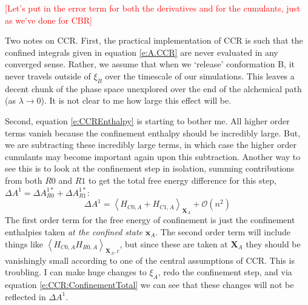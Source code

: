 \documentclass[%
 preprint,
 amsmath,amssymb,
 aps,
]{revtex4-1}
\newcommand{\warning}[1]{{\textsf{{\textcolor{red}{{[#1]}{}}}}}}
\renewcommand{\vec}[1]{{\mathbf{#1}}}
\begin{document}
 \warning{Let's put in the error term for both the derivatives and for the cumulants, just as we've done for CBR}
 
Two notes on CCR.  First, the practical implementation of CCR is such that the confined integrals given in equation \ref{e:A.CCR} are never evaluated in any converged sense.  Rather, we assume that when we `release' conformation B, it never travels outside of $\xi_B$ over the timescale of our simulations.  This leaves a decent chunk of the phase space unexplored over the end of the alchemical path (as $\lambda \rightarrow 0$).  It is not clear to me how large this effect will be. 
 
 Second, equation \ref{e:CCREnthalpy} is starting to bother me.  All higher order terms vanish because the confinement enthalpy should be incredibly large.  But, we are subtracting these incredibly large terms, in which case the higher order cumulants may become important again upon this subtraction.  
 Another way to see this is to look at the confinement step in isolation, summing contributions from both $R0$ and $R1$ to get the total free energy difference for this step, $\Delta A^1 = \Delta A^{1*}_ {R0}+\Delta A^{1*}_ {R1}$:
 \begin{equation}
 \Delta A^1 =  \left \langle H_{C0,A}+H_{C1,A} \right \rangle_{\vec{X}_A} + \mathcal{O} (n^2)
 \label{e:CCR:ConfinementTotal}
 \end{equation}
 The first order term for the free energy of confinement is just the confinement enthalpies taken \emph{at the confined state} $\vec{x}_A$.  The second order term will include things like $\left \langle H_{C0,A} H_{R0,A} \right \rangle_{\vec{X}_A,c}$, but since these are taken at $\vec{X}_A$ they should be vanishingly small according to one of the central assumptions of CCR.  This is troubling.  I can make huge changes to $\xi_A$, redo the confinement step, and via equation \ref{e:CCR:ConfinementTotal} we can see that these changes will not be reflected in $ \Delta A^1$.  
 
\end{document}
